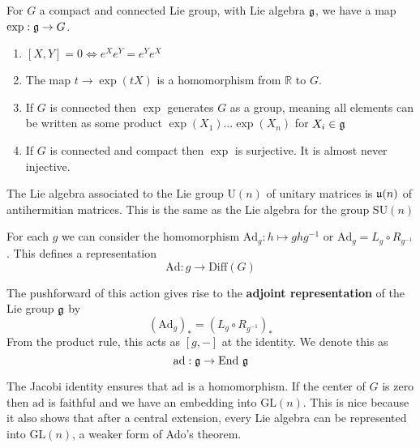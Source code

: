 		\begin{prop}
			For $G$ a compact and connected Lie group, with Lie algebra $\frak g$, we have a map $\exp : \frak g \rightarrow G$.
			\begin{enumerate}
				\item $[X,Y] = 0 \Leftrightarrow e^X e^Y = e^Y e^X$
				\item The map $t \rightarrow \exp(t X)$ is a homomorphism from $\mathbb R$ to $G$.
				\item If $G$ is connected then $\exp$ generates $G$ as a group, meaning all elements can be written as some product $\exp(X_1) \dots \exp(X_n)$ for $X_i \in \frak g$
				\item If $G$ is connected and compact then $\exp$ is surjective. It is almost never injective.
			\end{enumerate}
		\end{prop}
		
		\begin{eg}
			The Lie algebra associated to the Lie group $\mathrm U(n)$ of unitary matrices is $\frak u(n)$ of antihermitian matrices. This is the same as the Lie algebra for the group $\mathrm{SU}(n)$
		\end{eg}
		
		\begin{defn}
			For each $g$ we can consider the homomorphism $\mathrm{Ad}_g: h \mapsto g h g^{-1}$ or $\mathrm{Ad}_g = L_g \circ R_{g^{-1}}$. This defines a representation
			\begin{equation}
				\mathrm{Ad}: g \rightarrow \mathrm{Diff}(G)
			\end{equation}
		\end{defn}
		
		\begin{defn}
			The pushforward of this action gives rise to the \textbf{adjoint representation} of the Lie group $\frak g$ by
			\begin{equation}
				(\mathrm{Ad}_g)_* = (L_g \circ R_{g^{-1}})_* 
			\end{equation}
			From the product rule, this acts as $[g, -]$ at the identity. We denote this as
			\begin{equation}
				\mathrm{ad}: \frak g \rightarrow \mathrm{End}~ \frak g
			\end{equation}
		\end{defn}
		
		The Jacobi identity ensures that $\mathrm{ad}$ is a homomorphism. If the center of $G$ is zero then $\mathrm{ad}$ is faithful and we have an embedding into $\mathrm{GL}(n)$. This is nice because it also shows that after a central extension, every Lie algebra can be represented into $\mathrm{GL}(n)$, a weaker form of Ado's theorem.
		
